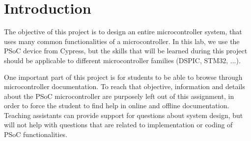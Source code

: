 \section{Introduction}

The objective of this project is to design an entire microcontroller system, that uses many common functionalities of a microcontroller. In this lab, we use the PSoC device from Cypress, but the skills that will be learned during this project should be applicable to different microcontroller families (DSPIC, STM32, ...). 

One important part of this project is for students to be able to browse through microcontroller documentation. To reach that objective, information and details about the PSoC microcontroller are purposely left out of this assignment, in order to force the student to find help in online and offline documentation. Teaching assistants can provide support for questions about system design, but will not help with questions that are related to implementation or coding of PSoC functionalities. 

